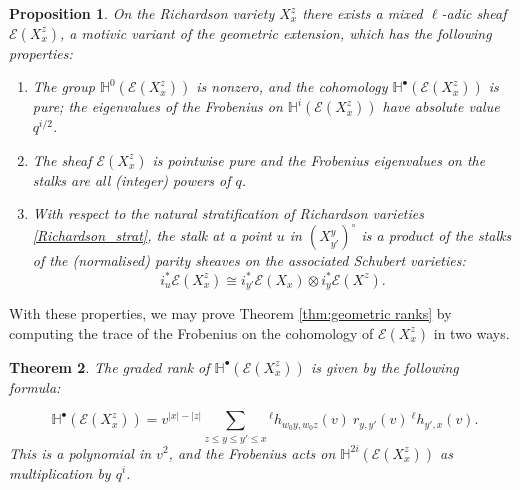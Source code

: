 \documentclass[11pt]{article}
\DeclareMathOperator{\grrk}{rk^{\bullet}}
\newtheorem{thm}{Theorem}
\newtheorem{prop}[thm]{Proposition}
\theoremstyle{remark}
\theoremstyle{definition}
\begin{document}
\begin{prop}\label{Prop:geo properties}
On the Richardson variety $X^z_x$ there exists a  mixed $\ell$-adic sheaf $\mathscr{E}(X^z_x)$, a motivic variant of the geometric extension, which has the following properties:
\begin{enumerate}
    \item The group $\mathbb{H}^0 (\mathscr{E}(X^z_x))$ is nonzero, and the cohomology $\mathbb{H}^\bullet (\mathscr{E}(X^z_x))$ is pure; the eigenvalues of the Frobenius on $\mathbb{H}^i(\mathscr{E}(X^z_x))$ have absolute value $q^{i/2}$.
    \item The sheaf $\mathscr{E}(X^z_x)$ is pointwise pure and the Frobenius eigenvalues on the stalks are all (integer) powers of $q$.
    \item With respect to the natural stratification of Richardson varieties \eqref{Richardson_strat}, the stalk at a point $u$ in $(X^{y}_{y'})^\circ$ is a product of the stalks of the (normalised) parity sheaves on the associated Schubert varieties:\[i_u^*\mathscr{E}(X^z_x)\cong i_{y'}^*\mathscr{E}(X_x)\otimes i_{y}^*\mathscr{E}(X^z).\]
    
\end{enumerate}
\end{prop}
With these properties, we may prove Theorem \ref{thm:geometric ranks} by computing the trace of the Frobenius on the cohomology of $\mathscr{E}(X^z_x)$ in two ways.
\begin{thm}\label{Thm:geo argument}
The graded rank of $\mathbb{H}^\bullet(\mathscr{E}(X^z_x))$ is given by the following formula: 

\[\grrk \mathbb{H}^\bullet(\mathscr{E}(X^z_x))=v^{|x|-|z|}\sum_{z \leq y \leq y' \leq x} {}^{\ell} h_{w_0 y, w_0 z}(v) ~ r_{y,y'}(v) ~{}^{\ell} h_{y',x}(v).\]
This is a polynomial in $v^2$, and the Frobenius acts on $\mathbb{H}^{2i}(\mathscr{E}(X^z_x))$ as multiplication by $q^i$.
\end{thm}
\end{document}
